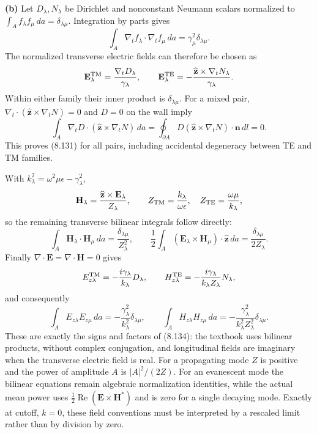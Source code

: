 \medskip\noindent\textbf{(b)} Let $D_\lambda,N_\lambda$ be Dirichlet and nonconstant Neumann
scalars normalized to $\int_A f_\lambda f_\mu\,da=\delta_{\lambda\mu}$.
Integration by parts gives
\[
\int_A\nabla_tf_\lambda\cdot\nabla_tf_\mu\,da
=\gamma_\mu^2\delta_{\lambda\mu}.
\]
The normalized transverse electric fields can therefore be chosen as
\[
\mathbf E_\lambda^{\rm TM}=\frac{\nabla_tD_\lambda}{\gamma_\lambda},
\qquad
\mathbf E_\lambda^{\rm TE}=
 -\frac{\widehat{\mathbf z}\times\nabla_tN_\lambda}{\gamma_\lambda}.
\]
Within either family their inner product is $\delta_{\lambda\mu}$.
For a mixed pair, $\nabla_t\cdot(\widehat{\mathbf z}\times\nabla_tN)=0$
and $D=0$ on the wall imply
\[
\int_A\nabla_tD\cdot(\widehat{\mathbf z}\times\nabla_tN)\,da
=\oint_{\partial A}D(\widehat{\mathbf z}\times\nabla_tN)
 \cdot\mathbf n\,dl=0.
\]
This proves (8.131) for all pairs, including accidental degeneracy
between TE and TM families.

With $k_\lambda^2=\omega^2\mu\epsilon-\gamma_\lambda^2$,
\[
\mathbf H_\lambda=\frac{\widehat{\mathbf z}\times\mathbf E_\lambda}
 {Z_\lambda},\qquad
Z_{\rm TM}=\frac{k_\lambda}{\omega\epsilon},\quad
Z_{\rm TE}=\frac{\omega\mu}{k_\lambda},
\]
so the remaining transverse bilinear integrals follow directly:
\[
\int_A\mathbf H_\lambda\cdot\mathbf H_\mu\,da
 =\frac{\delta_{\lambda\mu}}{Z_\lambda^2},\qquad
\frac12\int_A(\mathbf E_\lambda\times\mathbf H_\mu)
 \cdot\widehat{\mathbf z}\,da
 =\frac{\delta_{\lambda\mu}}{2Z_\lambda}.
\]
Finally $\nabla\cdot\mathbf E=\nabla\cdot\mathbf H=0$ gives
\[
E_{z\lambda}^{\rm TM}=-\frac{i\gamma_\lambda}{k_\lambda}D_\lambda,
\qquad
H_{z\lambda}^{\rm TE}=-\frac{i\gamma_\lambda}{k_\lambda Z_\lambda}N_\lambda,
\]
and consequently
\[
\boxed{\int_A E_{z\lambda}E_{z\mu}\,da
 =-\frac{\gamma_\lambda^2}{k_\lambda^2}\delta_{\lambda\mu},
\qquad
\int_A H_{z\lambda}H_{z\mu}\,da
 =-\frac{\gamma_\lambda^2}{k_\lambda^2Z_\lambda^2}\delta_{\lambda\mu}.}
\]
These are exactly the signs and factors of (8.134): the textbook
uses bilinear products, without complex conjugation, and longitudinal
fields are imaginary when the transverse electric field is real.
For a propagating mode $Z$ is positive and the power of amplitude
$A$ is $|A|^2/(2Z)$.  For an evanescent mode the bilinear equations
remain algebraic normalization identities, while the actual mean
power uses $\tfrac12\operatorname{Re}(\mathbf E\times\mathbf H^*)$
and is zero for a single decaying mode.  Exactly at cutoff,
$k=0$, these field conventions must be interpreted by a rescaled
limit rather than by division by zero.

